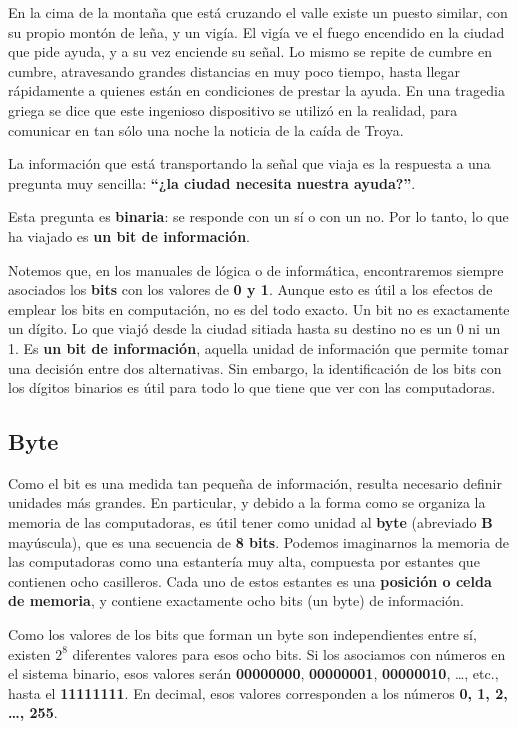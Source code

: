 \documentclass[spanish,A4,]{article}
\begin{document}
En la cima de la montaña que está cruzando el valle existe un puesto
similar, con su propio montón de leña, y un vigía. El vigía ve el fuego
encendido en la ciudad que pide ayuda, y a su vez enciende su señal. Lo
mismo se repite de cumbre en cumbre, atravesando grandes distancias en
muy poco tiempo, hasta llegar rápidamente a quienes están en condiciones
de prestar la ayuda. En una tragedia griega se dice que este ingenioso
dispositivo se utilizó en la realidad, para comunicar en tan sólo una
noche la noticia de la caída de Troya.

La información que está transportando la señal que viaja es la respuesta
a una pregunta muy sencilla: \textbf{``¿la ciudad necesita nuestra
ayuda?''}.

Esta pregunta es \textbf{binaria}: se responde con un sí o con un no.
Por lo tanto, lo que ha viajado es \textbf{un bit de información}.

Notemos que, en los manuales de lógica o de informática, encontraremos
siempre asociados los \textbf{bits} con los valores de \textbf{0 y 1}.
Aunque esto es útil a los efectos de emplear los bits en computación, no
es del todo exacto. Un bit no es exactamente un dígito. Lo que viajó
desde la ciudad sitiada hasta su destino no es un 0 ni un 1. Es
\textbf{un bit de información}, aquella unidad de información que
permite tomar una decisión entre dos alternativas. Sin embargo, la
identificación de los bits con los dígitos binarios es útil para todo lo
que tiene que ver con las computadoras.

\subsection{Byte}\label{byte}

Como el bit es una medida tan pequeña de información, resulta necesario
definir unidades más grandes. En particular, y debido a la forma como se
organiza la memoria de las computadoras, es útil tener como unidad al
\textbf{byte} (abreviado \textbf{B} mayúscula), que es una secuencia de
\textbf{8 bits}. Podemos imaginarnos la memoria de las computadoras como
una estantería muy alta, compuesta por estantes que contienen ocho
casilleros. Cada uno de estos estantes es una \textbf{posición o celda
de memoria}, y contiene exactamente ocho bits (un byte) de información.

Como los valores de los bits que forman un byte son independientes entre
sí, existen $2^8$ diferentes valores para esos ocho bits. Si los
asociamos con números en el sistema binario, esos valores serán
\textbf{00000000}, \textbf{00000001}, \textbf{00000010}, \ldots{}, etc.,
hasta el \textbf{11111111}. En decimal, esos valores corresponden a los
números \textbf{0, 1, 2, \ldots{}, 255}.
\end{document}
